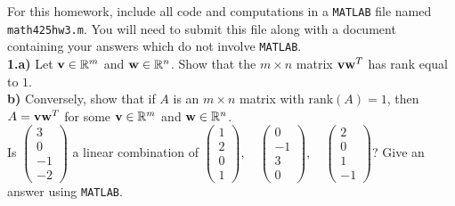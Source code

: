 \documentclass[11pt]{amsart}
\theoremstyle{definition}  %
\begin{document}


\noindent For this homework, include all code and computations in a {\tt MATLAB} file named {\tt math425hw3.m}.
You will need to submit this file along with a document containing your answers which do not
involve {\tt MATLAB}.\\


\noindent
{\bf 1.a)} Let ${\bf v} \in \mathbb{R}^m$ and ${\bf w} \in \mathbb{R}^n$. Show that the $m \times n$ matrix ${\bf v} {\bf w}^T$ has rank equal to $1$. \\
{\bf b)} Conversely, show that if $A$ is an $m \times n$ matrix with $\mathrm{rank}(A) = 1$, then $A = {\bf v} {\bf w}^T$ for some ${\bf v} \in \mathbb{R}^m$ and ${\bf w} \in \mathbb{R}^n$. \\

 Is $\left( \begin{array}{r} 3 \\ 0 \\ -1 \\ -2 \end{array} \right)$  a linear combination of 
$ \left( \begin{array}{r} 1 \\ 2 \\ 0 \\ 1 \end{array} \right), \quad   \left( \begin{array}{r} 0 \\ -1 \\ 3 \\ 0 \end{array} \right), \quad
\left( \begin{array}{r} 2 \\ 0 \\ 1 \\ -1\end{array} \right)$? Give an answer using {\tt MATLAB}. \\
\end{document}
